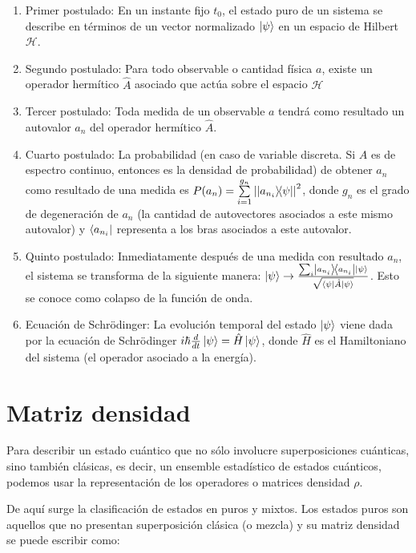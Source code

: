 \begin{enumerate}
    \item Primer postulado: En un instante fijo $t_0$, el estado puro de un sistema se describe en términos de un vector normalizado $\ket{\psi}$ en un espacio de Hilbert $\mathcal{H}$.
    \item Segundo postulado: Para todo observable o cantidad física $a$, existe un operador hermítico $\hat{A}$ asociado que actúa sobre el espacio $\mathcal{H}$
    \item Tercer postulado: Toda medida de un observable $a$ tendrá como resultado un autovalor $a_n$ del operador hermítico $\hat{A}$.
    \item Cuarto postulado: La probabilidad (en caso de variable discreta. Si $\hat{A}$ es de espectro continuo, entonces es la densidad de probabilidad) de obtener $a_n$ como resultado de una medida es $P(a_n) = \sum\limits_{i=1}^{g_n} \abs{\ketbra{a_{n_i}}{\psi}}^2$, donde $g_n$ es el grado de degeneración de $a_n$ (la cantidad de autovectores asociados a este mismo autovalor) y $\bra{a_{n_i}}$ representa a los bras asociados a este autovalor.
    \item Quinto postulado: Inmediatamente después de una medida con resultado $a_n$, el sistema se transforma de la siguiente manera: $\ket{\psi} \rightarrow \frac{\sum_i \ketbra{a_{n_i}}{a_{n_i}} \ket{\psi}}{\sqrt{\bra{\psi} \hat{A} \ket{\psi}}}$. Esto se conoce como colapso de la función de onda.
    \item Ecuación de Schrödinger: La evolución temporal del estado $\ket{\psi}$ viene dada por la ecuación de Schrödinger $i \hbar \frac{d}{d t} \ket{\psi} = \hat{H} \ket{\psi}$, donde $\hat{H}$ es el Hamiltoniano del sistema (el operador asociado a la energía).
\end{enumerate}

\section{Matriz densidad}

Para describir un estado cuántico que no sólo involucre superposiciones cuánticas, sino también clásicas, es decir, un ensemble estadístico de estados cuánticos, podemos usar la representación de los operadores o matrices densidad $\rho$.

De aquí surge la clasificación de estados en puros y mixtos. Los estados puros son aquellos que no presentan superposición clásica (o mezcla) y su matriz densidad se puede escribir como:

